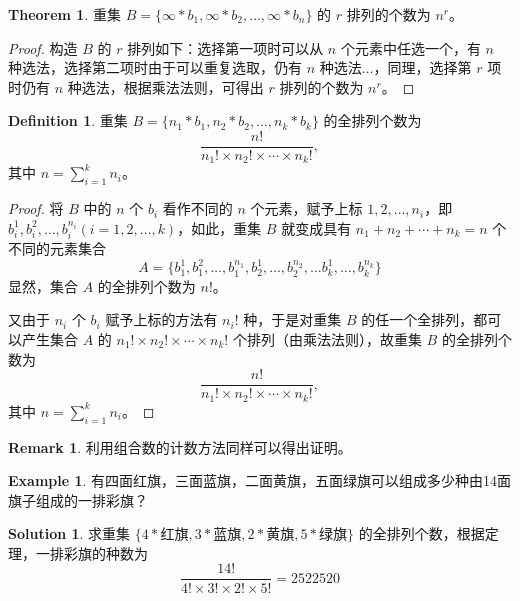 \documentclass[oneside]{book}
\theoremstyle{definition}
\newtheorem{example}{Example}[section]
\newtheorem{definition}{Definition}[section]
\newtheorem{theorem}{Theorem}[section]
\newtheorem{remark}{Remark}[section]
\newtheorem*{sol}{Solution}
\begin{document}
\begin{theorem}
	重集 \( B=\{\infty * b_1, \infty * b_2, \ldots, \infty * b_n\} \) 的 \(r\) 排列的个数为 \( n^r \)。
\end{theorem}

\begin{proof}
	构造 \( B \) 的 \(r\) 排列如下：选择第一项时可以从 \( n \) 个元素中任选一个，有 \( n \) 种选法，选择第二项时由于可以重复选取，仍有 \( n \) 种选法\(\dots\)，同理，选择第 \( r \) 项时仍有 \( n \) 种选法，根据乘法法则，可得出 \( r \) 排列的个数为 \( n^r \)。
\end{proof}
\begin{definition}
	重集 $B=\{n_1*b_1, n_2*b_2, \ldots, n_k*b_k\}$ 的全排列个数为  
	\[\frac{n!}{n_1! \times n_2! \times \cdots \times n_k!},\]
	其中 $n = \sum_{i=1}^k n_i$。
\end{definition}

\begin{proof}
	将 $B$ 中的 $n$ 个 $b_i$ 看作不同的 $n$ 个元素，赋予上标 $1, 2, \ldots, n_i$，即 $b_i^1, b_i^2, \ldots, b_i^{n_i} (i=1, 2, \ldots, k)$，如此，重集 $B$ 就变成具有 $n_1+n_2+\cdots+n_k=n$ 个不同的元素集合
	\[A=\{b_1^1, b_1^2, \ldots, b_1^{n_1}, b_2^1, \ldots, b_2^{n_2}, \ldots b_{k}^1, \ldots, b_{k}^{n_k}\}\]
	显然，集合 $A$ 的全排列个数为 $n!$。
	
	又由于 $n_i$ 个 $b_i$ 赋予上标的方法有 $n_i!$ 种，于是对重集 $B$ 的任一个全排列，都可以产生集合 $A$ 的 $n_1!\times n_2!\times \cdots \times n_k!$ 个排列（由乘法法则），故重集 $B$ 的全排列个数为
	\[\frac{n!}{n_1! \times n_2! \times \cdots \times n_k!},\]
	其中 $n = \sum_{i=1}^k n_i$。
\end{proof}
\begin{remark}
利用组合数的计数方法同样可以得出证明。
\end{remark}

\begin{example}
	有四面红旗，三面蓝旗，二面黄旗，五面绿旗可以组成多少种由14面旗子组成的一排彩旗？
\end{example}
\begin{sol}
求重集 $\{4*\text{红旗}, 3*\text{蓝旗}, 2*\text{黄旗}, 5*\text{绿旗}\}$ 的全排列个数，根据定理，一排彩旗的种数为
	\[ \frac{14!}{4!\times 3!\times 2!\times 5!} = 2522520 \]
\end{sol}
\end{document}

